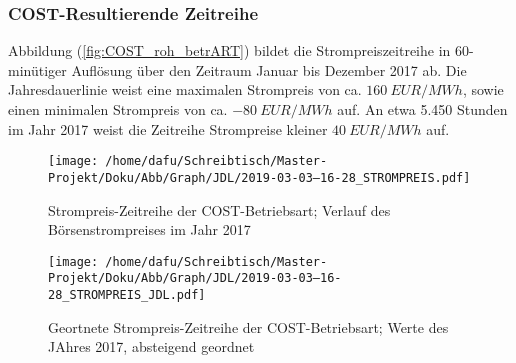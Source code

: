 \documentclass[onecolumn,10pt,titlepage]{article}
\begin{document}
\subsubsection{COST-Resultierende Zeitreihe}
Abbildung (\ref{fig:COST_roh_betrART}) bildet die Strompreiszeitreihe in 60-minütiger Auflösung über den Zeitraum Januar bis Dezember 2017 ab. Die Jahresdauerlinie weist eine maximalen Strompreis von  ca. $160~ EUR/MWh$, sowie einen minimalen Strompreis von ca. $-80 ~EUR/MWh$ auf. An etwa 5.450 Stunden im Jahr 2017 weist die Zeitreihe Strompreise kleiner $40 ~EUR/MWh$ auf. \\

\begin{figure}[H]
	\centering
	\begin{minipage}[t]{0.49\textwidth}
		\texttt{[image: /home/dafu/Schreibtisch/Master-Projekt/Doku/Abb/Graph/JDL/2019-03-03--16-28\_STROMPREIS.pdf]}
		
		\caption[Strompreis-Zeitreihe der COST-Betriebsart]{Strompreis-Zeitreihe der COST-Betriebsart; Verlauf des Börsenstrompreises im Jahr 2017}
		\label{fig:COST_roh_betrART} 
	\end{minipage}
	\hfill
	\begin{minipage}[t]{0.49\textwidth}
		\texttt{[image: /home/dafu/Schreibtisch/Master-Projekt/Doku/Abb/Graph/JDL/2019-03-03--16-28\_STROMPREIS\_JDL.pdf]}
		\caption[Geortnete Strompreis-Zeitreihe der COST-Betriebsart]{Geortnete Strompreis-Zeitreihe der COST-Betriebsart; Werte des JAhres 2017, absteigend geordnet}
		\label{fig:COST_JDL_betrART} 
	\end{minipage}
\end{figure}
%	


\end{document}
